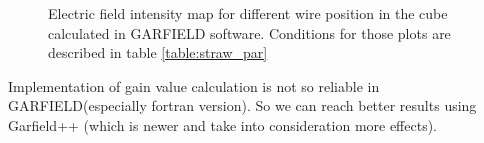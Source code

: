 \documentclass[]{article}
\begin{document}
	\begin{figure}[h!] 
		\centering
		\qquad
		\caption{Electric field intensity map for different wire position in the cube calculated in GARFIELD software. Conditions for those plots are described in table \ref{table:straw_par} }
	\end{figure}
	
	Implementation of gain value calculation is not so reliable in GARFIELD(especially fortran version). So we can reach better results using Garfield++ (which is newer and take into consideration more effects).
	
	
	
\end{document}
